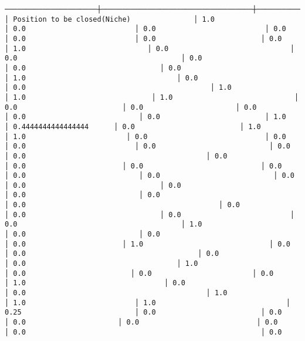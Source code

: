 \documentclass[11pt]{article}
\begin{document}
\begin{Verbatim}[commandchars=\\\{\}]
──────────────────────┼────────────────────────────────────┼─────────────────────────────────────────────────────┼───────────────────────────────────────────┼───────────────────────────────────────────┼────────────────────────────────────┼────────────────────────┼───────────────────────────────────────┼──────────────────────────────────────┼────────────────────────────────────┼────────────────────────────────────────┼────────────────────────────────┼──────────────────────────┼─────────────────────────────┤
│ Position to be closed(Niche)               │ 1.0                                      │ 0.0                          │ 0.0                          │ 0.0                          │ 0.0                          │ 0.0                         │ 0.0                         │ 1.0                             │ 0.0                             │ 0.0                                       │ 0.0                                  │ 0.0                                │ 0.0                                         │ 1.0                                    │ 0.0                                    │ 0.0                                            │ 1.0                             │ 1.0                              │ 1.0                             │ 0.0                         │ 0.0                      │ 0.0                                │ 0.0                           │ 0.0                         │ 1.0                      │ 0.4444444444444444      │ 0.0                         │ 1.0                                  │ 1.0                        │ 0.0                            │ 0.0                           │ 0.0                          │ 0.0                           │ 0.0                                            │ 0.0                                           │ 0.0                      │ 0.0                       │ 0.0                            │ 0.0                                │ 0.0                           │ 0.0                           │ 0.0                          │ 0.0                                │ 0.0                            │ 0.0                           │ 0.0                                         │ 0.0                                              │ 0.0                           │ 0.0                                │ 0.0                          │ 0.0                                       │ 1.0                          │ 0.0                           │ 0.0                                     │ 0.0                       │ 1.0                              │ 0.0                                     │ 0.0                                         │ 0.0                                         │ 0.0                                    │ 1.0                                │ 0.0                         │ 0.0                        │ 0.0                              │ 1.0                                 │ 0.0                            │ 0.0                                           │ 1.0                            │ 1.0                          │ 1.0                               │ 0.25                           │ 0.0                         │ 0.0                     │ 0.0                      │ 0.0                            │ 0.0                                   │ 0.0                                                        │ 0.0   
\end{Verbatim}
\end{document}
